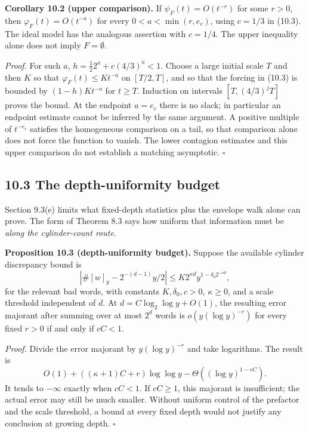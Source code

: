 \documentclass[11pt,a4paper]{article}
\begin{document}
\textbf{Corollary 10.2 (upper comparison).} If \(\psi_F(t)=O(t^{-r})\)
for some \(r>0\), then \(\varphi_F(t)=O(t^{-a})\) for every
\(0<a<\min(r,e_c)\), using \(c=1/3\) in (10.3). The ideal model has the
analogous assertion with \(c=1/4\). The upper inequality alone does not
imply \(F=\emptyset\).

\emph{Proof.} For such \(a\), \(h=\tfrac12 2^a+c(4/3)^a<1\). Choose a
large initial scale \(T\) and then \(K\) so that
\(\varphi_F(t)\le Kt^{-a}\) on \([T/2,T]\), and so that the forcing in
(10.3) is bounded by \((1-h)Kt^{-a}\) for \(t\ge T\). Induction on
intervals \([T,(4/3)^jT]\) proves the bound. At the endpoint \(a=e_c\)
there is no slack; in particular an endpoint estimate cannot be inferred
by the same argument. A positive multiple of \(t^{-e_c}\) satisfies the
homogeneous comparison on a tail, so that comparison alone does not
force the function to vanish. The lower contagion estimates and this
upper comparison do not establish a matching asymptotic. \(\square\)

\subsection{10.3 The depth-uniformity
budget}\label{the-depth-uniformity-budget}

Section 9.3(e) limits what fixed-depth statistics plus the envelope walk
alone can prove. The form of Theorem 8.3 says how uniform that
information must be \emph{along the cylinder-count route}.

\textbf{Proposition 10.3 (depth-uniformity budget).} Suppose the
available cylinder discrepancy bound is \[
\left|\#[w]_y-2^{-(d-1)}y/2\right|
 \le K2^{\kappa d}y^{1-\delta_0 2^{-cd}},
\] for the relevant bad words, with constants \(K,\delta_0,c>0\),
\(\kappa\ge0\), and a scale threshold independent of \(d\). At
\(d=C\log_2\log y+O(1)\), the resulting error majorant after summing
over at most \(2^d\) words is \(o(y(\log y)^{-r})\) for every fixed
\(r>0\) if and only if \(cC<1\).

\emph{Proof.} Divide the error majorant by \(y(\log y)^{-r}\) and take
logarithms. The result is \[
O(1)+((\kappa+1)C+r)\log\log y
 -\Theta((\log y)^{1-cC}).
\] It tends to \(-\infty\) exactly when \(cC<1\). If \(cC\ge1\), this
majorant is insufficient; the actual error may still be much smaller.
Without uniform control of the prefactor and the scale threshold, a
bound at every fixed depth would not justify any conclusion at growing
depth. \(\square\)
\end{document}
